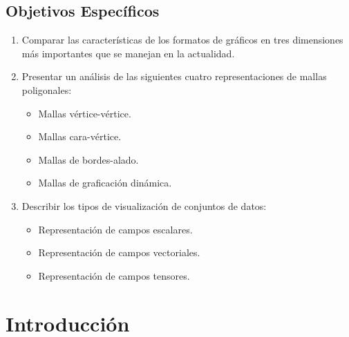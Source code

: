 \documentclass[11pt,letterpaper]{article}     %
\begin{document}
\subsection{Objetivos Espec\' ificos} 
\begin{enumerate}
\item Comparar las caracter\' isticas de los formatos de gr\' aficos en tres dimensiones m\' as importantes que se manejan en la actualidad.
\item Presentar un an\' alisis de las siguientes cuatro representaciones de mallas poligonales:
	\begin{itemize}
	\item Mallas v\' ertice-v\' ertice.
	\item Mallas cara-v\' ertice.
	\item Mallas de bordes-alado.
	\item Mallas de graficaci\' on din\' amica.
	\end{itemize}

%

\item Describir los tipos de visualizaci\' on de conjuntos de datos:
	\begin{itemize}
	\item Representaci\' on de campos escalares.
	\item Representaci\' on de campos vectoriales.
	\item Representaci\' on de campos tensores.
	\end{itemize}
	
\end{enumerate}

\section{Introducci\' on}
\end{document}
